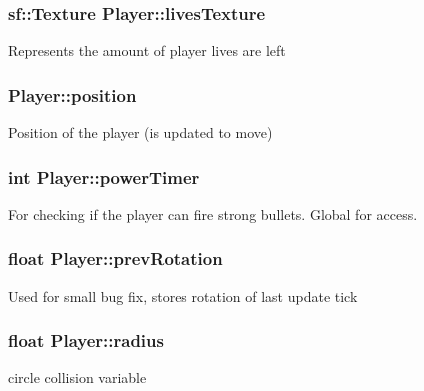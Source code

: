 \subsubsection[{\texorpdfstring{lives\+Texture}{livesTexture}}]{\setlength{\rightskip}{0pt plus 5cm}sf\+::\+Texture Player\+::lives\+Texture\hspace{0.3cm}{\ttfamily [private]}}\hypertarget{class_player_a91cb40005f212595ce807fedf874fde6}{}\label{class_player_a91cb40005f212595ce807fedf874fde6}
Represents the amount of player lives are left 
\subsubsection[{\texorpdfstring{position}{position}}]{ Player\+::position\hspace{0.3cm}{\ttfamily [private]}}\hypertarget{class_player_acf13aec63f3c028acbbf431a3c2aa9f5}{}\label{class_player_acf13aec63f3c028acbbf431a3c2aa9f5}
Position of the player (is updated to move) 
\subsubsection[{\texorpdfstring{power\+Timer}{powerTimer}}]{\setlength{\rightskip}{0pt plus 5cm}int Player\+::power\+Timer}\hypertarget{class_player_a04fce59d939c7644cf08ca86441e7285}{}\label{class_player_a04fce59d939c7644cf08ca86441e7285}
For checking if the player can fire strong bullets. Global for access. 
\subsubsection[{\texorpdfstring{prev\+Rotation}{prevRotation}}]{\setlength{\rightskip}{0pt plus 5cm}float Player\+::prev\+Rotation\hspace{0.3cm}{\ttfamily [private]}}\hypertarget{class_player_a458923e42b021f2a7747e6d94912ad2a}{}\label{class_player_a458923e42b021f2a7747e6d94912ad2a}
Used for small bug fix, stores rotation of last update tick 
\subsubsection[{\texorpdfstring{radius}{radius}}]{\setlength{\rightskip}{0pt plus 5cm}float Player\+::radius\hspace{0.3cm}{\ttfamily [private]}}\hypertarget{class_player_a9bb3da6cfcb057fb879b5e22f22bf3b7}{}\label{class_player_a9bb3da6cfcb057fb879b5e22f22bf3b7}
circle collision variable 
